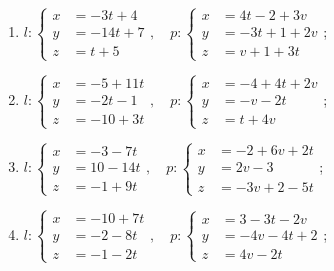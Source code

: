 \begin{enumerate}
			\item \( l: \left\lbrace \begin{aligned}
						x &= -3t+4 \\
						y &= -14t+7 \\
						z &= t+5
					\end{aligned} \right., \quad p: \left\lbrace \begin{aligned}
						x &= 4t-2+3v \\
						y &= -3t+1+2v \\
						z &= v+1+3t
					\end{aligned} \right. \);
			\item \( l: \left\lbrace \begin{aligned}
						x &= -5+11t \\
						y &= -2t-1 \\
						z &= -10+3t
					\end{aligned} \right., \quad p: \left\lbrace \begin{aligned}
						x &= -4+4t+2v \\
						y &= -v-2t \\
						z &= t+4v
					\end{aligned} \right. \);
			\item \( l: \left\lbrace \begin{aligned}
						x &= -3-7t \\
						y &= 10-14t \\
						z &= -1+9t
					\end{aligned} \right., \quad p: \left\lbrace \begin{aligned}
						x &= -2+6v+2t \\
						y &= 2v-3 \\
						z &= -3v+2-5t
					\end{aligned} \right. \);
			\item \( l: \left\lbrace \begin{aligned}
						x &= -10+7t \\
						y &= -2-8t \\
						z &= -1-2t
					\end{aligned} \right., \quad p: \left\lbrace \begin{aligned}
						x &= 3-3t-2v \\
						y &= -4v-4t+2 \\
						z &= 4v-2t
					\end{aligned} \right. \);

		\setcounter{tasks}{\value{enumi}}
	\end{enumerate}

